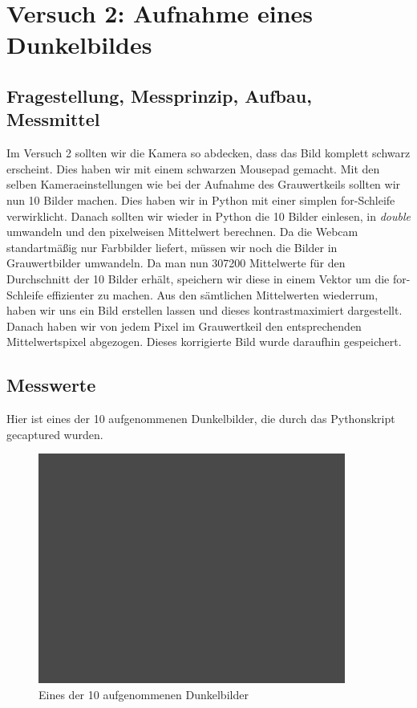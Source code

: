\documentclass[12pt, oneside, a4paper, \docLanguage]{report}
\begin{document}
%
%
\chapter{Versuch 2: Aufnahme eines Dunkelbildes}
\label{chap:VERSUCH_2}

\section{Fragestellung, Messprinzip, Aufbau, Messmittel}
\label{chap:VERSUCH_2_FRAGESTELLUNG}
Im Versuch 2 sollten wir die Kamera so abdecken, dass das Bild komplett schwarz erscheint. Dies haben wir mit einem schwarzen Mousepad gemacht.
Mit den selben Kameraeinstellungen wie bei der Aufnahme des Grauwertkeils sollten wir nun 10 Bilder machen. 
\newline
Dies haben wir in Python mit einer simplen for-Schleife verwirklicht.
Danach sollten wir wieder in Python die 10 Bilder einlesen, in \textit{double} umwandeln und den pixelweisen Mittelwert berechnen.
\newline
\newline
Da die Webcam standartmäßig nur Farbbilder liefert, müssen wir noch die Bilder in Grauwertbilder umwandeln.
Da man nun 307200 Mittelwerte für den Durchschnitt der 10 Bilder erhält, speichern wir diese in einem Vektor um die for-Schleife effizienter zu machen.
\newline
Aus den sämtlichen Mittelwerten wiederrum, haben wir uns ein Bild erstellen lassen und dieses kontrastmaximiert dargestellt.
Danach haben wir von jedem Pixel im Grauwertkeil den entsprechenden Mittelwertspixel abgezogen. Dieses korrigierte Bild wurde daraufhin gespeichert.


\newpage
\section{Messwerte}
\label{chap:VERSUCH_2_MESSWERTE}
Hier ist eines der 10 aufgenommenen Dunkelbilder, die durch das Pythonskript gecaptured wurden.
\begin{figure}[hbt!]
	\centering\small
	\includegraphics[width=0.9\textwidth]{../data/black1.png}
	\caption{Eines der 10 aufgenommenen Dunkelbilder}
	\label{fig:Eines der 10 aufgenommenen Dunkelbilder}
\end{figure}
\newpage
\end{document}
